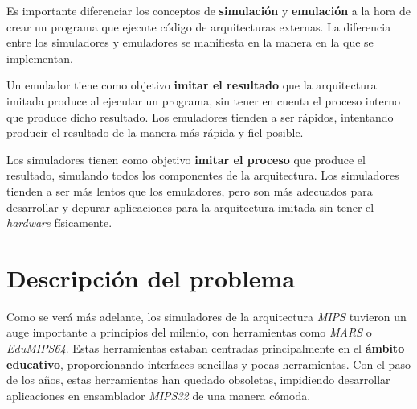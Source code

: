 Es importante diferenciar los conceptos de \textbf{simulación}
y \textbf{emulación} a la hora de crear un programa que ejecute
código de arquitecturas externas.
La diferencia entre los simuladores y emuladores se manifiesta
en la manera en la que se implementan.

\noindent Un emulador tiene como objetivo \textbf{imitar el resultado}
que la arquitectura imitada produce al ejecutar un programa, sin tener
en cuenta el proceso interno que produce dicho resultado.
Los emuladores tienden a ser rápidos, intentando producir el resultado
de la manera más rápida y fiel posible.

\noindent Los simuladores tienen como objetivo \textbf{imitar el proceso}
que produce el resultado, simulando todos los componentes de la arquitectura.
Los simuladores tienden a ser más lentos que los emuladores, pero son más
adecuados para desarrollar y depurar aplicaciones para la arquitectura
imitada sin tener el \textit{hardware} físicamente.


\section{Descripción del problema}\label{sec:descripcion-del-problema}

Como se verá más adelante, los simuladores de la arquitectura \textit{MIPS} tuvieron
un auge importante a principios del milenio, con herramientas como \textit{MARS}\cite{MARS}
o \textit{EduMIPS64}\cite{EDUMIPS64}.
Estas herramientas estaban centradas principalmente en el \textbf{ámbito educativo}, proporcionando
interfaces sencillas y pocas herramientas.
Con el paso de los años, estas herramientas han quedado obsoletas, impidiendo desarrollar aplicaciones
en ensamblador \textit{MIPS32} de una manera cómoda.

